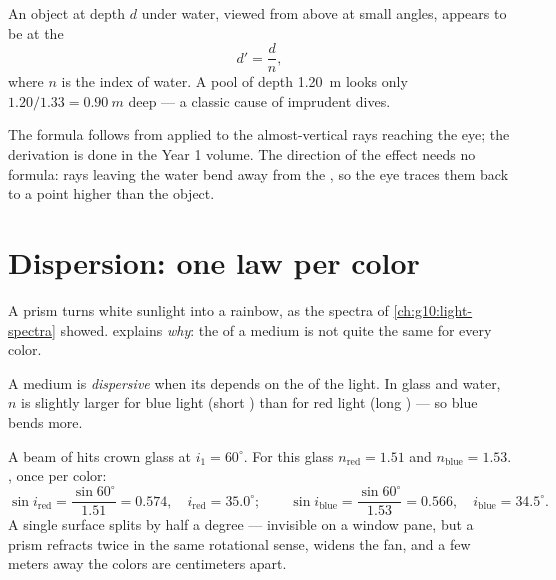 \begin{proposition}\label{prop:g10:refraction:depth}
An object at depth $d$ under water, viewed from above at small angles,
appears to be at the \emph{}
\[
d' = \frac{d}{n} ,
\]
where $n$ is the index of water. A pool of depth \qty{1.20}{m} looks
only $1.20/1.33 = \qty{0.90}{m}$ deep --- a classic cause of imprudent
dives.
\end{proposition}
\admitted

\begin{remark}\label{rem:g10:refraction:depthhonest}
The formula follows from  applied to the almost-vertical rays
reaching the eye; the derivation is done in the Year 1 volume. The
direction of the effect needs no formula: rays leaving the water bend
away from the , so the eye traces them back to a point higher
than the object.
\end{remark}

\section{Dispersion: one law per color}

A prism turns white sunlight into a rainbow, as the spectra of
\cref{ch:g10:light-spectra} showed.  explains \emph{why}: the
 of a medium is not quite the same for every color.

\begin{definition}[Dispersion]\label{def:g10:refraction:dispersion}
A medium is \emph{dispersive} when its  depends on the  of the light. In glass and water, $n$ is
slightly larger for blue light (short ) than for red light
(long ) --- so blue bends more.
\end{definition}

\begin{example}\label{ex:g10:refraction:twocolors}
A beam of  hits crown glass at $i_1 = 60^\circ$. For this
glass $n_{\text{red}} = 1.51$ and $n_{\text{blue}} = 1.53$. ,
once per color:
\[
\sin i_{\text{red}} = \frac{\sin 60^\circ}{1.51} = 0.574,
\quad i_{\text{red}} = 35.0^\circ ;
\qquad
\sin i_{\text{blue}} = \frac{\sin 60^\circ}{1.53} = 0.566,
\quad i_{\text{blue}} = 34.5^\circ .
\]
A single surface splits  by half a degree --- invisible on a
window pane, but a prism refracts twice in the same rotational sense,
widens the fan, and a few meters away the colors are centimeters apart.
\end{example}

